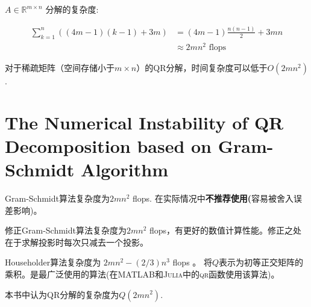 $ A \in \mathbb{R}^{m \times n} $ 分解的复杂度:

$$ \begin{aligned} \sum_{k=1}^{n}((4 m-1)(k-1)+3 m) &=(4 m-1) \frac{n(n-1)}{2}+3 m n \\ & \approx 2 m n^{2} \text { flops } \end{aligned} $$

对于稀疏矩阵（空间存储小于$m \times n$）的QR分解，时间复杂度可以低于$O(2mn^2)$. 



\section{The Numerical Instability of QR Decomposition based on Gram-Schmidt Algorithm}

Gram-Schmidt算法复杂度为$2mn^2$ flops. 在实际情况中\textbf{不推荐使用(}容易被舍入误差影响)。

修正Gram-Schmidt算法复杂度为$2mn^2$ flops，有更好的数值计算性能。修正之处在于求解投影时每次只减去一个投影。

Householder算法复杂度为 $ 2 m n^{2}-(2 / 3) n^{3} $ flops 。
将$Q$表示为初等正交矩阵的乘积。是最广泛使用的算法(在\textsc{MATLAB}和\textsc{Julia}中的\textsc{qr}函数使用该算法)。

本书中认为QR分解的复杂度为$Q(2mn^2)$.

